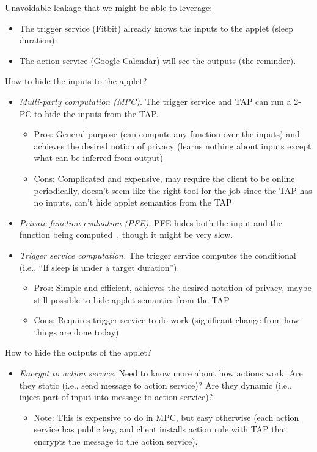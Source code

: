Unavoidable leakage that we might be able to leverage:
\begin{itemize}[leftmargin=*]
  \item The trigger service (Fitbit) already knows the inputs to the applet
    (sleep duration).
  \item The action service (Google Calendar) will see the outputs (the
    reminder).
\end{itemize}\bigskip

How to hide the inputs to the applet?
\begin{itemize}[leftmargin=*]
  \item \emph{Multi-party computation (MPC).} The trigger service and TAP can
    run a 2-PC to hide the inputs from the TAP.
    \begin{itemize}
      \item Pros: General-purpose (can compute any function over the inputs) and
        achieves the desired notion of privacy (learns nothing about inputs
        except what can be inferred from output)
      \item Cons: Complicated and expensive, may require the client to be online
        periodically, doesn't seem like the right tool for the job since the TAP
        has no inputs, can't hide applet semantics from the TAP
    \end{itemize}
  \item \emph{Private function evaluation (PFE).} PFE hides both the input and
    the function being computed~\cite{DBLP:conf/eurocrypt/MohasselS13}, though
    it might be very slow.
  \item \emph{Trigger service computation.} The trigger service computes the
    conditional (i.e., ``If sleep is under a target duration'').
    \begin{itemize}
      \item Pros: Simple and efficient, achieves the desired notation of
        privacy, maybe still possible to hide applet semantics from the TAP
      \item Cons: Requires trigger service to do work (significant change from
        how things are done today)
    \end{itemize}
\end{itemize}\bigskip

How to hide the outputs of the applet?
\begin{itemize}[leftmargin=*]
  \item \emph{Encrypt to action service.} Need to know more about how actions
    work. Are they static (i.e., send message to action service)? Are they
    dynamic (i.e., inject part of input into message to action service)?
    \begin{itemize}
      \item Note: This is expensive to do in MPC, but easy otherwise (each
        action service has public key, and client installs action rule with TAP
        that encrypts the message to the action service).
    \end{itemize}
\end{itemize}\bigskip

